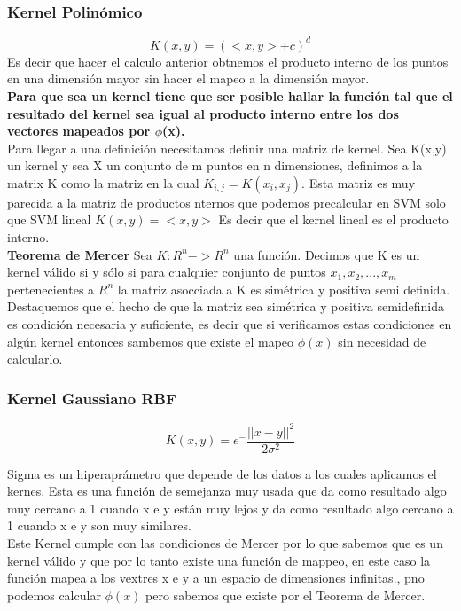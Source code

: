\documentclass[titlepage,a4paper]{article}
\begin{document}
\subsubsection*{Kernel Polinómico}
$$K(x,y) = (<x,y> +c)^d$$
Es decir que hacer el calculo anterior obtnemos el producto interno de los puntos en una dimensión mayor sin hacer el mapeo a la dimensión mayor. \\
\textbf{
Para que sea un kernel tiene que ser posible hallar la función tal que el resultado del kernel sea igual al producto interno entre los dos vectores mapeados por $\phi$(x). }\\

Para llegar a una definición necesitamos definir una matriz de kernel. Sea K(x,y) un kernel y sea X un conjunto de m puntos en n dimensiones, definimos a la matrix K como la matriz en la cual $K_{i,j} = K(x_i, x_j) $. Esta matriz es muy parecida a la matriz de productos nternos que podemos precalcular en SVM solo que SVM lineal $K(x,y)  = <x,y>$ Es decir que el kernel lineal es el producto interno. \\

\textbf{Teorema de Mercer} Sea $K:R^n -> R^n$ una función. Decimos que K es un kernel válido si y sólo si para cualquier conjunto de puntos $x_1, x_2, ..., x_m $ pertenecientes a $R^n$ la matriz asocciada a K es simétrica y positiva semi definida. \\

Destaquemos que el hecho de que la matriz sea simétrica y positiva semidefinida es condición necesaria y 
suficiente, es decir que si verificamos estas condiciones en algún kernel entonces sambemos que existe el mapeo $\phi(x)$ sin necesidad de calcularlo. 

\subsubsection*{Kernel Gaussiano RBF}
$$ K(x,y) = e^-\frac{|| x-y|| ^2}{2\sigma ^2} $$


Sigma es un hiperaprámetro que depende de los datos a los cuales aplicamos el kernes. Esta es una función de semejanza muy usada que da como resultado algo muy cercano a 1 cuando x e y están muy lejos y da como  resultado algo cercano a 1 cuando x e y son muy similares. \\

Este Kernel cumple con las condiciones de Mercer por lo que sabemos que es un kernel válido y que por lo tanto existe una función de mappeo, en este caso la función mapea a los vextres x e y a un espacio de dimensiones infinitas., pno podemos calcular  $\phi(x)$  pero sabemos que existe por el Teorema de Mercer. 
\end{document}
